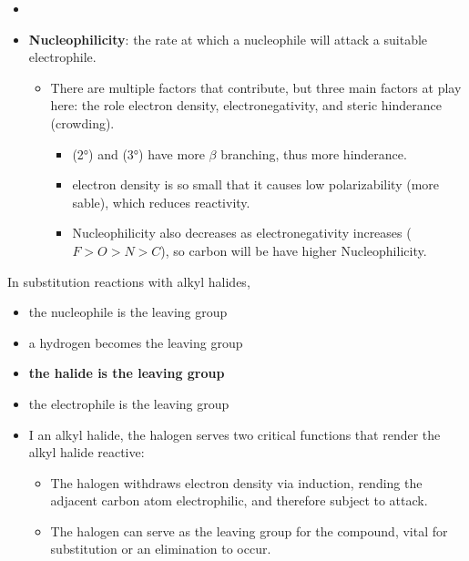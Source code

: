 \documentclass[12pt,a4paper]{article}
\begin{document}
\begin{enumerate}
{\begin{itemize}
        \item {}
    \end{itemize}
    }
    \begin{itemize}
        \item \textbf{Nucleophilicity}: the rate at which a nucleophile will attack a suitable electrophile.
        \begin{itemize}
            \item There are multiple factors that contribute, but three main factors at play here: the role electron density, electronegativity, and steric hinderance (crowding). 
                \begin{itemize}
                    \item {} (\ang{2}) and  (\ang{3}) have more $\beta$ branching, thus more hinderance.
                    \item {} electron density is so small that it causes low polarizability (more sable), which reduces reactivity.
                    \item Nucleophilicity also decreases as electronegativity increases (\(F>O>N>C\)), so carbon will be have higher Nucleophilicity.
                \end{itemize}
        \end{itemize}
    \end{itemize}
    {\color{G-Moon}\item In substitution reactions with alkyl halides,
    \begin{itemize}
        \item the nucleophile is the leaving group
        \item a hydrogen becomes the leaving group
        \item {\color{o-Sun}\textbf{the halide is the leaving group}}
        \item the electrophile is the leaving group
    \end{itemize}
    }
    \begin{itemize}
        \item I an alkyl halide, the halogen serves two critical functions that render the alkyl halide reactive:
        \begin{itemize}
            \item The halogen withdraws electron density via {\color{o-Sun}induction}, rending the adjacent carbon atom electrophilic, and therefore subject to attack.
            \item The halogen can serve as the {\color{o-Sun}leaving group} for the compound, vital for substitution or an elimination to occur.

\end{itemize}
\end{itemize}
\end{enumerate}
\end{document}
